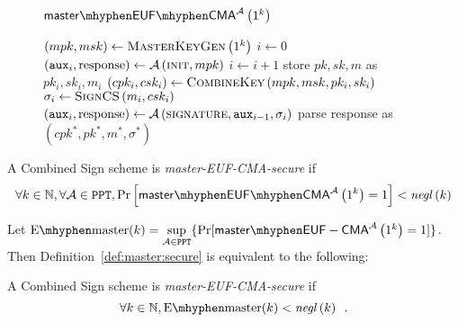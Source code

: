    \begin{figure}[H]
      \begin{gamebox}{$\mathsf{master \mhyphen EUF \mhyphen
      CMA}^{\adversary}\left(1^k\right)$}
        \begin{algorithmic}[1]
          \State $\left(mpk, msk\right) \gets
          \textsc{MasterKeyGen}\left(1^k\right)$
          \State $i \gets 0$
          \State $\left(\mathtt{aux}_i, \mathrm{response}\right) \gets
          \mathcal{A}\left(\textsc{init}, mpk\right)$
            \State $i \gets i + 1$
            \State store $pk, sk, m$ as $pk_i, sk_i, m_i$
            \State $\left(cpk_i, csk_i\right) \gets
            \textsc{CombineKey}\left(mpk, msk, pk_i, sk_i\right)$
            \State $\sigma_i \gets \textsc{SignCS}\left(m_i, csk_i\right)$
            \State $\left(\mathtt{aux}_i, \mathrm{response}\right) \gets
            \mathcal{A}\left(\textsc{signature}, \mathtt{aux}_{i-1},
            \sigma_i\right)$
          \EndWhile
          \State parse response as $\left(cpk^*, pk^*, m^*, \sigma^*\right)$
            \State {}
          \Else
            \State {}
          \EndIf
        \end{algorithmic}
      \end{gamebox}
      \caption{}
      \label{game:comb:master}
    \end{figure}
    \begin{definition}
      \label{def:master:secure}
      A Combined Sign scheme is \emph{\textsf{master-EUF-CMA}-secure} if
      \begin{equation*}
        \forall k \in \mathbb{N}, \forall \adversary \in \mathtt{PPT},
        \Pr\left[\mathsf{master \mhyphen EUF \mhyphen
        CMA}^{\adversary}\left(1^k\right) = 1\right] <
        \mathit{negl}\left(k\right)
      \end{equation*}
    \end{definition}

    Let $\mathrm{E \mhyphen master}(k) = \underset{\adversary \in
    \mathtt{PPT}}{\sup}\{\Pr[\mathsf{master \mhyphen
    EUF-CMA}^{\adversary}\left(1^k\right) = 1]\}$. Then
    Definition~\ref{def:master:secure} is equivalent to the following:

    \begin{definition}
      \label{def:master:secure:sup}
      A Combined Sign scheme is \emph{\textsf{master-EUF-CMA}-secure} if
      \begin{equation*}
        \forall k \in \mathbb{N}, \mathrm{E \mhyphen master}(k) <
        \mathit{negl}\left(k\right) \enspace.
      \end{equation*}
    \end{definition}

